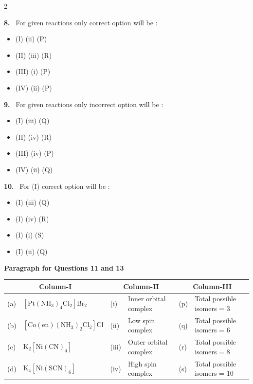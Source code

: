 \documentclass[10pt]{extarticle}
\newcommand{\qn}[1]{\par\smallskip\noindent\textbf{#1.}~}
\newcommand{\paraq}[2]{\par\smallskip\noindent\textbf{Paragraph for Questions #1 and #2}\par}
\newenvironment{qoptions}{\begin{itemize}[leftmargin=1.8em,itemsep=1pt,topsep=2pt,label={}]}{\end{itemize}}
\newcommand{\opt}[2]{\item[(#1)] #2}
\begin{document}
\begin{multicols}{2}
\qn{8} For given reactions only correct option will be :
\begin{qoptions}
\opt{A}{(I) (ii) (P)}
\opt{B}{(II) (iii) (R)}
\opt{C}{(III) (i) (P)}
\opt{D}{(IV) (ii) (P)}
\end{qoptions}
\qn{9} For given reactions only incorrect option will be :
\begin{qoptions}
\opt{A}{(I) (iii) (Q)}
\opt{B}{(II) (iv) (R)}
\opt{C}{(III) (iv) (P)}
\opt{D}{(IV) (ii) (Q)}
\end{qoptions}
\qn{10} For (I) correct option will be :
\begin{qoptions}
\opt{A}{(I) (iii) (Q)}
\opt{B}{(I) (iv) (R)}
\opt{C}{(I) (i) (S)}
\opt{D}{(I) (ii) (Q)}
\end{qoptions}
\paraq{11}{13}
\end{multicols}
\noindent\begin{minipage}{\textwidth}
\footnotesize\setlength{\tabcolsep}{3pt}\begin{tabular}{|l|l|l|l|l|l|}
\hline
\multicolumn{2}{|c|}{Column-I} & \multicolumn{2}{c|}{Column-II} & \multicolumn{2}{c|}{Column-III}\\
\hline
(a) & $\mathrm{[Pt(NH_3)_4Cl_2]Br_2}$ & (i) & Inner orbital complex & (p) & Total possible isomers = 3\\
(b) & $\mathrm{[Co(en)(NH_3)_2Cl_2]Cl}$ & (ii) & Low spin complex & (q) & Total possible isomers = 6\\
(c) & $\mathrm{K_2[Ni(CN)_4]}$ & (iii) & Outer orbital complex & (r) & Total possible isomers = 8\\
(d) & $\mathrm{K_4[Ni(SCN)_6]}$ & (iv) & High spin complex & (s) & Total possible isomers = 10\\
\hline
\end{tabular}
\end{minipage}
\end{document}
